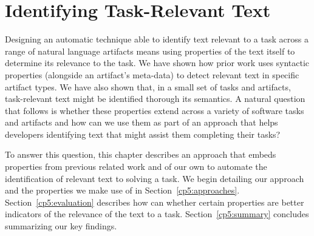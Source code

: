\setcounter{chapter}{4}
\setcounter{rq}{1}


\chapter{Identifying Task-Relevant Text}
\label{ch:identifying}








Designing an automatic technique able to identify text relevant to a task across a range of natural language artifacts means using 
properties of the text itself to determine its relevance to the task.
We have shown how  prior work uses syntactic properties (alongside an artifact's meta-data)
to detect relevant text in specific artifact types.
We have also shown that, in a small set of tasks and artifacts, task-relevant text might be identified thorough its semantics.
A natural question that follows is whether these properties 
extend across a variety of software tasks and artifacts
and how can we use them as part of an approach that 
helps developers identifying text that might assist them completing their tasks?















To answer this question, this chapter describes an 
approach 
that embeds properties from previous related work and of our own
to automate the identification of relevant text to solving a task. 
We begin detailing our approach and the properties we make use of in Section~\ref{cp5:approaches}. 
Section~\ref{cp5:evaluation}
describes how can
 whether certain properties are better indicators of the relevance of the text to a task.
Section~\ref{cp5:summary} concludes summarizing our key findings.


